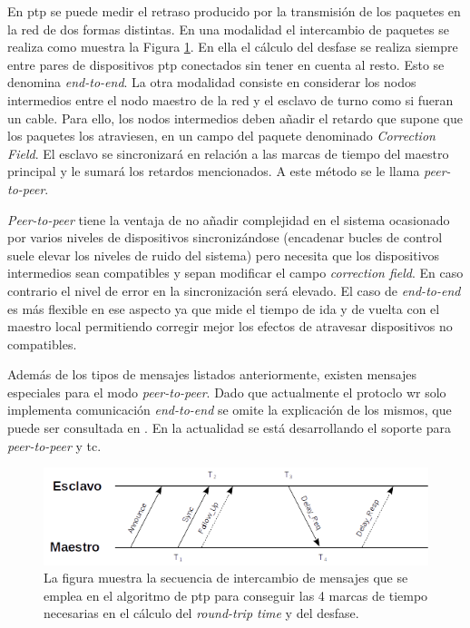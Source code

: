 En \gls{ptp} se puede medir el retraso producido por la transmisión de los 
paquetes en la red de dos formas distintas. En una modalidad el intercambio de 
paquetes se realiza como muestra la Figura \ref{fig:ptpts}. En ella el cálculo 
del desfase se realiza siempre entre pares de 
dispositivos \gls{ptp} conectados sin tener en cuenta al resto. Esto se 
denomina \textit{end-to-end}.
La otra modalidad consiste en considerar los nodos intermedios entre el nodo 
maestro de la red y el esclavo de turno como si fueran un cable. Para ello, 
los nodos intermedios deben añadir el retardo que supone que los paquetes 
los atraviesen, en un campo del paquete denominado \textit{Correction 
Field}. El esclavo se sincronizará en relación a las marcas de tiempo del 
maestro principal y le sumará los retardos mencionados. A este método se le 
llama \textit{peer-to-peer}.

\textit{Peer-to-peer} tiene la ventaja de no añadir complejidad en el sistema 
ocasionado por varios niveles de dispositivos sincronizándose (encadenar bucles 
de control suele elevar los niveles de ruido del sistema) pero necesita que los 
dispositivos intermedios sean compatibles y sepan modificar el campo 
\textit{correction field}. En caso contrario el nivel de error en la 
sincronización será elevado. El caso de \textit{end-to-end} es más flexible en 
ese aspecto ya que mide el tiempo de ida y de vuelta con el maestro local 
permitiendo corregir mejor los efectos de atravesar dispositivos no compatibles.

Además de los tipos de mensajes listados anteriormente, existen mensajes 
especiales para el modo \textit{peer-to-peer}. Dado que actualmente el protoclo 
\gls{wr} solo implementa comunicación \textit{end-to-end} se omite la 
explicación de los mismos, que puede ser consultada en \cite{IEEE1588_2008}.
En la actualidad se está desarrollando el soporte para \textit{peer-to-peer} y 
\gls{tc}.

\begin{figure}
	\centering
	\includegraphics[width=0.7\linewidth]{imagenes/ptp_ts}
	\caption[Intercambio de mensajes para el algoritmo de \acrshort{ptp}]{La 
	figura muestra la secuencia de intercambio de mensajes 
	que se emplea en el algoritmo de \gls{ptp} para conseguir las 4 marcas de 
	tiempo necesarias en el cálculo del \textit{round-trip time} y del desfase.}
	\label{fig:ptpts}
\end{figure}

